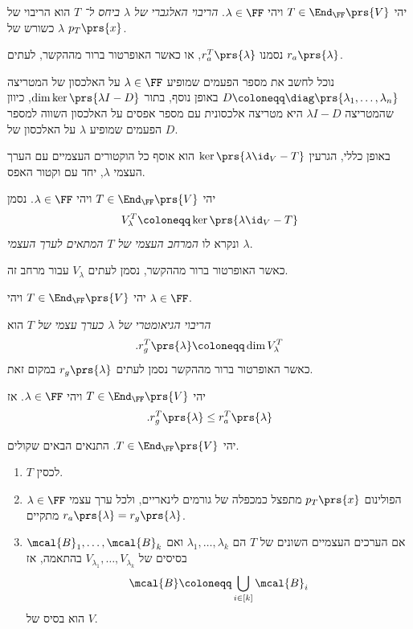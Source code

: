 \documentclass[a4paper,10pt,twoside,openany]{book}
\begin{document}
\begin{definition}
יהי
$T \in \End_\FF\prs{V}$
ויהי
$\lambda \in \FF$.
\emph{הריבוי האלגברי של
$\lambda$ ביחס ל־%
$T$}
הוא הריבוי של
$\lambda$
כשורש של
$p_T\prs{x}$.

נסמנו
$r_a^T\prs{\lambda}$,
או כאשר האופרטור ברור מההקשר, לעתים
$r_a\prs{\lambda}$.
\end{definition}

נוכל לחשב את מספר הפעמים שמופיע
$\lambda \in \FF$
על האלכסון של
המטריצה
$D \coloneqq \diag\prs{\lambda_1, \ldots, \lambda_n}$
באופן נוסף, בתור
$\dim \ker\prs{\lambda I - D}$,
כיוון שהמטריצה
$\lambda I - D$
היא מטריצה אלכסונית עם מספר אפסים על האלכסון השווה למספר הפעמים שמופיע
$\lambda$
על האלכסון של
$D$.

באופן כללי, הגרעין
$\ker\prs{\lambda \id_V - T}$
הוא אוסף כל הוקטורים העצמיים עם הערך העצמי
$\lambda$,
יחד עם וקטור האפס.

\begin{definition}
יהי
$T \in \End_\FF\prs{V}$
ויהי
$\lambda \in \FF$.
נסמן
\[V_\lambda^T \coloneqq \ker\prs{\lambda \id_V - T}\]
ונקרא לו
\emph{המרחב העצמי של
$T$
המתאים לערך העצמי
$\lambda$}.

כאשר האופרטור ברור מההקשר, נסמן לעתים
$V_\lambda$
עבור מרחב זה.
\end{definition}

\begin{definition}
יהי
$T \in \End_\FF\prs{V}$
ויהי
$\lambda \in \FF$.

\emph{הריבוי הגיאומטרי של
$\lambda$
כערך עצמי של
$T$}
הוא
\begin{align*}
\text{.} r^T_g\prs{\lambda} \coloneqq \dim V^T_{\lambda}
\end{align*}
כאשר האופרטור ברור מההקשר נסמן לעתים
$r_g\prs{\lambda}$
במקום זאת.
\end{definition}

\begin{proposition}
יהי
$T \in \End_\FF\prs{V}$
ויהי
$\lambda \in \FF$.
אז
\[\text{.} r_g^T\prs{\lambda} \leq r_a^T\prs{\lambda}\]
\end{proposition}

\begin{proposition} \label{proposition:diag-equivalence}
יהי
$T \in \End_\FF\prs{V}$.
התנאים הבאים שקולים.

\begin{enumerate}[label = (\alph*)]
\item $T$ לכסין.
\item הפולינום
$p_T\prs{x}$
מתפצל כמכפלה של גורמים לינאריים, ולכל ערך עצמי
$\lambda \in \FF$
מתקיים
$r_a\prs{\lambda} = r_g\prs{\lambda}$.
\item אם הערכים העצמיים השונים של
$T$
הם
$\lambda_1, \ldots, \lambda_k$
ואם
$\mcal{B}_1, \ldots, \mcal{B}_k$
בסיסים של
$V_{\lambda_1}, \ldots, V_{\lambda_k}$
בהתאמה, אז
\[\mcal{B} \coloneqq \bigcup_{i \in [k]} \mcal{B}_i\]
הוא בסיס של
$V$.
\end{enumerate}
\end{proposition}
\end{document}

